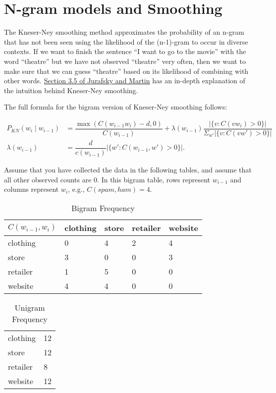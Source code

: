 \documentclass[twoside,10pt]{article}
\begin{document}
\newpage

\section{N-gram models and Smoothing}

The Kneser-Ney smoothing method approximates the probability of an n-gram that
has not been seen using the likelihood of the (n-1)-gram to occur in diverse contexts.
If we want to finish the sentence “I want to go to the movie” with the word
“theatre” but we have not observed “theatre” very often, then we want to make sure
that we can guess “theatre” based on its likelihood of combining with other words. \href{https://web.stanford.edu/~jurafsky/slp3/3.pdf}{Section 3.5 of Jurafsky and Martin} has an in-depth explanation of the intuition behind Kneser-Ney smoothing.

The full formula for the bigram version of Kneser-Ney smoothing follows:

\begin{align*}
    P_{\mathit{KN}}(w_i \mid w_{i-1}) &= \dfrac{\max(C(w_{i-1} w_i) - d, 0)}{C(w_{i-1})} + \lambda(w_{i-1}) \dfrac{\left| \{ v : C(vw_i) > 0 \} \right|}{\Sigma_{w'}\left| \{ v : C(vw') > 0\} \right|}\\
    \lambda(w_{i-1}) &= \dfrac{d}{c(w_{i-1})} \left| \{w' : C(w_{i-1}, w') > 0\} \right|.
\end{align*}

Assume that you have collected the data in the following tables, and assume that
all other observed counts are 0. In this bigram table, rows represent $w_{i-1}$ and columns represent $w_i$, e.g., $C(spam, ham) = 4$.

\begin{table}[h!]
\centering
\begin{tabular}{@{}lllll@{}}
\toprule
$C(w_{i-1}, w_i)$ & clothing & store & retailer & website \\ \midrule
clothing                & 0    & 4   & 2    & 4      \\
store                 & 3    & 0   & 0    & 3      \\
retailer                & 1    & 5   & 0    & 0      \\
website              & 4    & 4   & 0    & 0      \\ \bottomrule
\end{tabular}
\caption{Bigram Frequency}
\end{table}


\begin{table}[h!]
\centering
\begin{tabular}{l|l}
clothing   & 12 \\
store    & 12 \\
retailer   & 8  \\
website & 12
\end{tabular}
\caption{Unigram Frequency}
\end{table}
\end{document}
